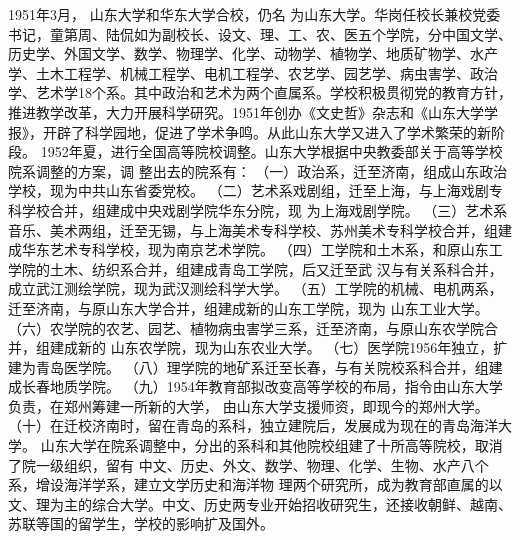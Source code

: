 \documentclass[openany]{sduthesis} %
\begin{document}
1951年3月， 山东大学和华东大学合校，仍名 为山东大学。华岗任校长兼校党委书记，童第周、陆侃如为副校长、设文、理、工、农、医五个学院，分中国文学、历史学、外国文学、数学、物理学、化学、动物学、植物学、地质矿物学、水产学、土木工程学、机械工程学、电机工程学、农艺学、园艺学、病虫害学、政治 学、艺术学18个系。其中政治和艺术为两个直属系。学校积极贯彻党的教育方针，推进教学改革，大力开展科学研究。1951年创办《文史哲》杂志和《山东大学学报》，开辟了科学园地，促进了学术争鸣。从此山东大学又进入了学术繁荣的新阶段。 1952年夏，进行全国高等院校调整。山东大学根据中央教委部关于高等学校院系调整的方案，调 整出去的院系有： （一）政治系，迁至济南，组成山东政治学校，现为中共山东省委党校。 （二）艺术系戏剧组，迁至上海，与上海戏剧专科学校合并，组建成中央戏剧学院华东分院，现 为上海戏剧学院。 （三）艺术系音乐、美术两组，迁至无锡，与上海美术专科学校、苏州美术专科学校合并，组建 成华东艺术专科学校，现为南京艺术学院。 （四）工学院和土木系，和原山东工学院的土木、纺织系合并，组建成青岛工学院，后又迁至武 汉与有关系科合并，成立武江测绘学院，现为武汉测绘科学大学。 （五）工学院的机械、电机两系，迁至济南，与原山东大学合并，组建成新的山东工学院，现为 山东工业大学。 （六）农学院的农艺、园艺、植物病虫害学三系，迁至济南，与原山东农学院合并，组建成新的 山东农学院，现为山东农业大学。 （七）医学院1956年独立，扩建为青岛医学院。 （八）理学院的地矿系迁至长春，与有关院校系科合并，组建成长春地质学院。 （九）1954年教育部拟改变高等学校的布局，指令由山东大学负责，在郑州筹建一所新的大学， 由山东大学支援师资，即现今的郑州大学。 （十）在迁校济南时，留在青岛的系科，独立建院后，发展成为现在的青岛海洋大学。 山东大学在院系调整中，分出的系科和其他院校组建了十所高等院校，取消了院一级组织，留有 中文、历史、外文、数学、物理、化学、生物、水产八个系，增设海洋学系，建立文学历史和海洋物 理两个研究所，成为教育部直属的以文、理为主的综合大学。中文、历史两专业开始招收研究生，还接收朝鲜、越南、苏联等国的留学生，学校的影响扩及国外。 
\end{document}
